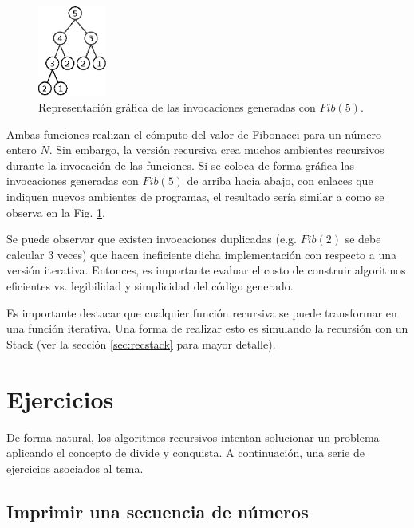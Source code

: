 \begin{figure}[htpb!]
  \begin{center}
    \includegraphics[width=0.2\textwidth]{images/fibonacciTree.eps}
  \end{center}
  \caption{Representación gráfica de las invocaciones generadas con $Fib(5)$.}
  \label{fig:Ch1fib}
\end{figure}

Ambas funciones realizan el cómputo del valor de Fibonacci para un número entero $N$. Sin embargo, la versión recursiva crea muchos ambientes recursivos durante la invocación de las funciones. Si se coloca de forma gráfica las invocaciones generadas con $Fib(5)$ de arriba hacia abajo, con enlaces que indiquen nuevos ambientes de programas, el resultado sería similar a como se observa en la Fig. \ref{fig:Ch1fib}. 

Se puede observar que existen invocaciones duplicadas (e.g. $Fib(2)$ se debe calcular 3 veces) que hacen ineficiente dicha implementación con respecto a una versión iterativa. Entonces, es importante evaluar el costo de construir algoritmos eficientes vs. legibilidad y simplicidad del código generado.

Es importante destacar que cualquier función recursiva se puede transformar en una función iterativa. Una forma de realizar esto es simulando la recursión con un Stack (ver la sección \ref{sec:recstack} para mayor detalle).

\section{Ejercicios}

De forma natural, los algoritmos recursivos intentan solucionar un problema aplicando el concepto de divide y conquista. A continuación, una serie de ejercicios asociados al tema.

\subsection{Imprimir una secuencia de números}

